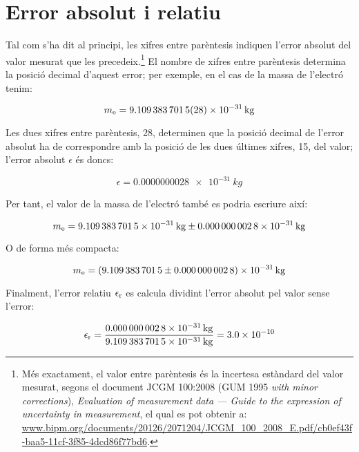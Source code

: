  
  
 
   
  
  
  
  
  
 \index{$\sigma$}  


\section{Error absolut i relatiu}\label{sec:err_abs_rel}

Tal com s'ha dit al principi, les xifres entre parèntesis indiquen l'error absolut del valor mesurat que les precedeix.\footnote{Més exactament, el valor entre parèntesis és la incertesa estàndard del valor mesurat, segons el document JCGM 100:2008 (GUM 1995 \textit{with minor
corrections}), \textit{Evaluation of measurement data --- Guide to the expression of uncertainty in
measurement}, el qual es pot obtenir a:  \href{https://www.bipm.org/documents/20126/2071204/JCGM\_100\_2008\_E.pdf/cb0ef43f-baa5-11cf-3f85-4dcd86f77bd6}{www.bipm.org/documents/20126/2071204/JCGM\_100\_2008\_E.pdf/cb0ef43f-baa5-11cf-3f85-4dcd86f77bd6}.} El nombre de xifres entre parèntesis determina la posició decimal d'aquest error; per exemple, en el cas de la  massa de l'electró tenim:

\[
    m_\mathrm{e} = \qty{9,109 383 7015(28) e-31}{kg}
\]

Les dues xifres entre parèntesis, 28, determinen que la posició decimal de l'error absolut ha de correspondre amb la posició de les dues últimes xifres, 15, del valor; l'error absolut $\epsilon$  és doncs:

\[
    \epsilon = \qty{0,000 000 0028 e-31}{kg}
\]

Per tant, el valor de la massa de l'electró també es podria escriure així:

 \[
    m\ped{e} = \qty[separate-uncertainty,separate-uncertainty-units = repeat]{9,109 383 7015(28) e-31}{kg}
\]

O de forma més compacta:

\[
m\ped{e} = \qty[separate-uncertainty,separate-uncertainty-units = bracket]{9,109 383 7015(28) e-31}{kg}
\]

Finalment, l'error relatiu $\epsilon_\mathrm{r}$ es calcula dividint l'error absolut pel valor sense l'error:

\[
    \epsilon_\mathrm{r} = \frac{\qty{0,000 000 0028 e-31}{kg}}{\qty{9,109 383 7015 e-31}{kg}} =   \num{3,0e-10}
\]
